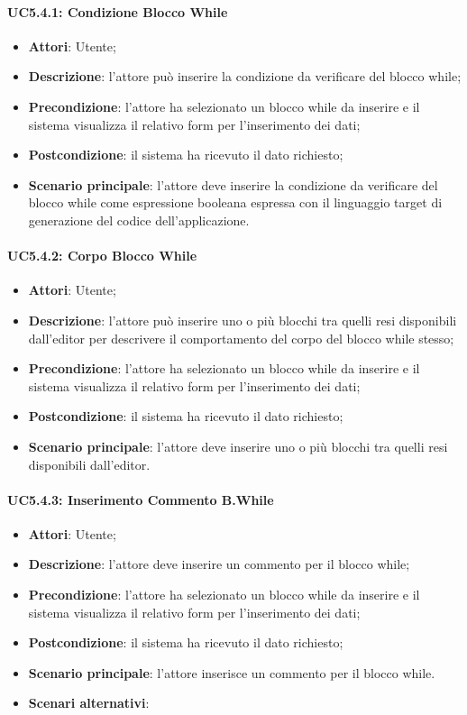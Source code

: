 \paragraph{UC5.4.1: Condizione Blocco While	}
\label{UC5.4.1}
\begin{itemize}
\item \textbf{Attori}: Utente;
\item \textbf{Descrizione}: l'attore può inserire la condizione da verificare del blocco while;	
\item \textbf{Precondizione}: l'attore ha selezionato un blocco while da inserire e il sistema visualizza il relativo form per l'inserimento dei dati;
\item \textbf{Postcondizione}: il sistema ha ricevuto il dato richiesto;	
\item \textbf{Scenario principale}:
l'attore deve inserire la condizione da verificare del blocco while come espressione booleana espressa con il linguaggio target di generazione del codice dell'applicazione.
\end{itemize}

\paragraph{UC5.4.2: Corpo Blocco While}
\label{UC5.4.2}
\begin{itemize}
\item \textbf{Attori}: Utente;
\item \textbf{Descrizione}: l'attore può inserire uno o più blocchi tra quelli resi disponibili dall'editor per descrivere il comportamento del corpo del blocco while stesso;	
\item \textbf{Precondizione}: l'attore ha selezionato un blocco while da inserire e il sistema visualizza il relativo form per l'inserimento dei dati;	
\item \textbf{Postcondizione}: il sistema ha ricevuto il dato richiesto;	
\item \textbf{Scenario principale}:
l'attore deve inserire uno o più blocchi tra quelli resi disponibili dall'editor.	
\end{itemize}

\paragraph{UC5.4.3: Inserimento Commento B.While	}
\label{UC5.4.3}
\begin{itemize}
\item \textbf{Attori}: Utente;
\item \textbf{Descrizione}: l'attore deve inserire un commento per il blocco while;	
\item \textbf{Precondizione}: l'attore ha selezionato un blocco while da inserire e il sistema visualizza il relativo form per l'inserimento dei dati;	
\item \textbf{Postcondizione}: il sistema ha ricevuto il dato richiesto;	
\item \textbf{Scenario principale}:
l'attore inserisce un commento per il blocco while.
\item \textbf{Scenari alternativi}:
	

\end{itemize}

